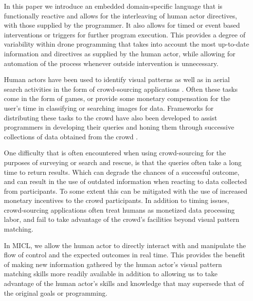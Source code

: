 \documentclass{sig-alternate-05-2015}
\begin{document}
In this paper we introduce an embedded domain-specific language that is
functionally reactive and allows for the interleaving of human actor
directives, with those supplied by the programmer. It also allows for timed or
event based interventions or triggers for further program execution. This
provides a degree of variability within drone programming that takes into
account the most up-to-date information and directives as supplied by the
human actor, while allowing for automation of the process whenever outside
intervention is unnecessary.


Human actors have been used to identify visual patterns as well as in aerial
search activities in the form of crowd-sourcing applications
\cite{quinn2011hc}. Often these tasks come in the form of games, or provide
some monetary compensation for the user's time in classifying or searching
images for data. Frameworks for distributing these tasks to the crowd have
also been developed to assist programmers in developing their queries and
honing them through successive collections of data obtained from the crowd
\cite{little2010turkit}.

One difficulty that is often encountered when using crowd-sourcing for the
purposes of surveying or search and rescue, is that the queries often take a
long time to return results. Which can degrade the chances of a successful
outcome, and can result in the use of outdated information when reacting to
data collected from participants. To some extent this can be mitigated with
the use of increased monetary incentives to the crowd participants. In
addition to timing issues, crowd-sourcing applications often treat humans as
monetized data processing labor, and fail to take advantage of the crowd's
facilities beyond visual pattern matching.

In MICL, we allow the human actor to directly interact with and manipulate the
flow of control and the expected outcomes in real time. This provides the
benefit of making new information gathered by the human actor's visual pattern
matching skills more readily available in addition to allowing us to take
advantage of the human actor's skills and knowledge that may supersede that of
the original goals or programming.
\end{document}
